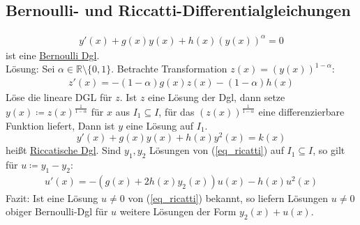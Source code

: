 \subsection{Bernoulli- und Riccatti-Differentialgleichungen}
\begin{align*}
    y'(x) + g(x)y(x) + h(x)(y(x))^\alpha = 0
\end{align*}
ist eine \underline{Bernoulli Dgl}. \\
Lösung: Sei $\alpha \in \mathbb{R} \setminus \{0,1\}$. Betrachte Transformation $z(x) = (y(x))^{1 - \alpha}$:
\begin{align*}
    z'(x) = - (1-\alpha)g(x)z(x) -(1-\alpha)h(x)
\end{align*}
Löse die lineare DGL für $z$. Ist $z$ eine Lösung der Dgl, dann setze $y(x) \coloneqq z(x)^{\frac{1}{1 - \alpha}}$ für $x$ aus $I_1 \subseteq I$,
für das $(z(x))^{\frac{1}{1- \alpha}}$ eine differenzierbare Funktion liefert, Dann ist $y$ eine Lösung auf $I_1$.
\begin{equation} \label{eq_ricatti}
    y'(x) + g(x)y(x) + h(x)y^2(x) = k(x)
\end{equation}
heißt \underline{Riccatische Dgl}. Sind $y_1,y_2$ Lösungen von (\ref{eq_ricatti}) auf $I_1 \subseteq I$, so gilt für $u \coloneqq y_1 - y_2$:
\begin{align*}
    u'(x) = -(g(x) + 2h(x)y_2(x))u(x) - h(x)u^2(x)
\end{align*}
Fazit: Ist eine Lösung $u \neq 0$ von (\ref{eq_ricatti}) bekannt, so liefern Lösungen $u \neq 0$ obiger Bernoulli-Dgl für $u$ weitere Lösungen der Form $y_2(x) + u(x)$.

